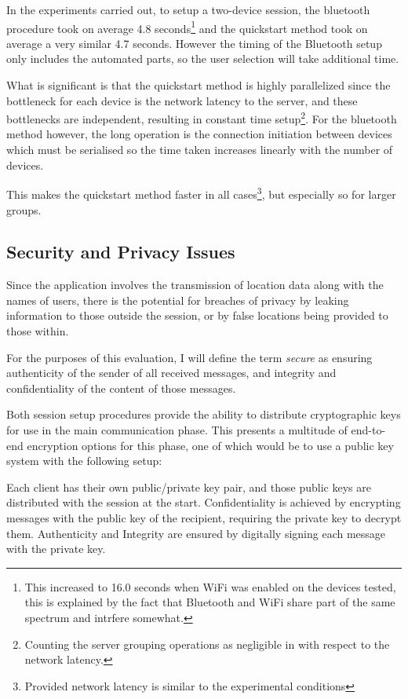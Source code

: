 In the experiments carried out, to setup a two-device session, the bluetooth procedure took on average 4.8 seconds\footnote{This increased to 16.0 seconds when WiFi was enabled on the devices tested, this is explained by the fact that Bluetooth and WiFi share part of the same spectrum and intrfere somewhat.\cite{btwifi}} and the quickstart method took on average a very similar 4.7 seconds. However the timing of the Bluetooth setup only includes the automated parts, so the user selection will take additional time.

What is significant is that the quickstart method is highly parallelized since the bottleneck for each device is the network latency to the server, and these bottlenecks are independent, resulting in constant time setup\footnote{Counting the server grouping operations as negligible in with respect to the network latency.}. For the bluetooth method however, the long operation is the connection initiation between devices which must be serialised so the time taken increases linearly with the number of devices.

This makes the quickstart method faster in all cases\footnote{Provided network latency is similar to the experimental conditions}, but especially so for larger groups.

\subsection{Security and Privacy Issues}

Since the application involves the transmission of location data along with the names of users, there is the potential for breaches of privacy by leaking information to those outside the session, or by false locations being provided to those within.

For the purposes of this evaluation, I will define the term \emph{secure} as ensuring authenticity of the sender of all received messages, and integrity and confidentiality of the content of those messages.

Both session setup procedures provide the ability to distribute cryptographic keys for use in the main communication phase. This presents a multitude of end-to-end encryption options for this phase, one of which would be to use a public key system with the following setup:

Each client has their own public/private key pair, and those public keys are distributed with the session at the start. Confidentiality is achieved by encrypting messages with the public key of the recipient, requiring the private key to decrypt them. Authenticity and Integrity are ensured by digitally signing each message with the private key.

